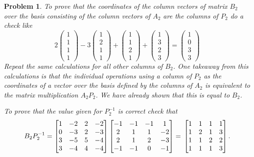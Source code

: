 \documentclass{article}
\theoremstyle{pprop}
\newtheorem{problem}{Problem}[section]
\begin{document}
\begin{problem}
To prove that the coordinates of the column vectors of matrix $B_2$ over the basis consisting of the column vectors of $A_2$ are the columns of $P_2$ do a check like
$$
2
\begin{pmatrix}
1 \\ 1 \\ 1 \\ 1
\end{pmatrix}
-3
\begin{pmatrix}
1 \\ 2 \\ 1 \\ 1
\end{pmatrix}
+
\begin{pmatrix}
1 \\ 1 \\ 2 \\ 1
\end{pmatrix}
+\begin{pmatrix}
1 \\ 3 \\ 2 \\ 3
\end{pmatrix}=
\begin{pmatrix}
1 \\ 0 \\ 3 \\ 3
\end{pmatrix}
$$
Repeat the same calculations for all other columns of $B_2$. One takeaway from this calculations is that the individual operations 
using a column of $P_2$ as the coordinates of a vector over the basis defined by the columns of $A_2$ is equivalent to the matrix 
multiplication $A_2P_2$. We have already shown that this is equal to $B_2$.

To prove that the value given for $P_2^{-1}$ is correct check that
$$
B_2P_2^{-1}=
\begin{bmatrix}
1 & -2 & 2 & -2 \\
0 & -3 & 2 & -3 \\
3 & -5 & 5 & -4 \\
3 & -4 & 4 & -4
\end{bmatrix}
\begin{bmatrix}
-1 & -1 & -1 & 1 \\
2 & 1 & 1 & -2 \\
2 & 1 & 2 & -3 \\
-1 & -1 & 0 & -1
\end{bmatrix}=\\
\begin{bmatrix}
1 & 1 & 1 & 1 \\
1 & 2 & 1 & 3 \\
1 & 1 & 2 & 2 \\
1 & 1 & 1 & 3
\end{bmatrix}.
$$ 


\end{problem}
\end{document}

